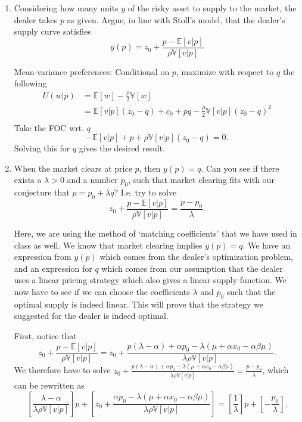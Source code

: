 \documentclass[11pt
, answers
]{exam}
\begin{document}
\begin{enumerate}[label=(\alph*). ]
\item Considering how many units $y$ of the risky asset to supply to the market, the dealer takes $p$ as given. Argue, in line with Stoll's model, that the dealer's supply curve satisfies
\[
y(p) =z_{0} +  \frac{p - \mathbb{E}[v|p]}{\rho \mathbb{V}[v|p]} 
\]

\begin{solution}
Mean-variance preferences: Conditional on $p$, maximize with respect to $q$ the following
\begin{align*}
U(w|p) 
& = \mathbb{E}[w] - \frac{\rho}{2} \mathbb{V}[w] \\
& = \mathbb{E}[v|p](z_{0}-q) + c_{0}+pq - \frac{\rho}{2} \mathbb{V}[v|p](z_{0}-q)^{2} \\
\end{align*}
Take the FOC wrt. $q$
\[
-\mathbb{E}[v|p] + p +\rho\mathbb{V}[v|p](z_{0}-q) = 0.
\]
Solving this for $q$ gives the desired result.
\end{solution}


\item When the market clears at price $p$, then $y(p)=q$. Can you see if there exists a $\lambda>0$ and a number $p_{0}$, such that market clearing fits with our conjecture that $p=p_{0}+\lambda q$? I.e. try to solve
\[
z_{0} +  \frac{p - \mathbb{E}[v|p]}{\rho \mathbb{V}[v|p]} = \frac{p-p_{0}}{\lambda}.
\]

\begin{solution}
Here, we are using the method of `matching coefficients' that we have used in class as well. We know that market clearing implies $y(p)=q$. We have an expression from $y(p)$ which comes from the dealer's optimization problem, and an expression for $q$ which comes from our assumption that the dealer uses a linear pricing strategy which also gives a linear supply function. We now have to see if we can choose the coefficients $\lambda$ and $p_0$ such that the optimal supply is indeed linear. This will prove that the strategy we suggested for the dealer is indeed optimal. 

First, notice that
\[
z_{0}+ \frac{p-\mathbb{E}[v|p]}{\rho \mathbb{V}[v|p]}=z_{0}+\frac{p(\lambda-\alpha) +\alpha p_{0}-\lambda (\mu + \alpha x_{0} - \alpha \beta \mu) }{\lambda \rho \mathbb{V}[v|p]}.
\]
We therefore have to solve $z_{0}+\frac{p(\lambda-\alpha) +\alpha p_{0}-\lambda (\mu + \alpha x_{0} - \alpha \beta \mu) }{\lambda \rho \mathbb{V}[v|p]}= \frac{p-p_{0}}{\lambda}$, which can be rewritten as
\[
\left[ \frac{\lambda-\alpha }{\lambda \rho \mathbb{V}[v|p]}  \right]p + \left[ z_{0} +\frac{\alpha p_{0}-\lambda (\mu + \alpha x_{0} - \alpha \beta \mu) }{\lambda \rho \mathbb{V}[v|p]} \right] = \left[\frac{1}{\lambda}\right]p + \left[-\frac{p_{0}}{\lambda}\right].
\]


\end{solution}
\end{enumerate}
\end{document}
